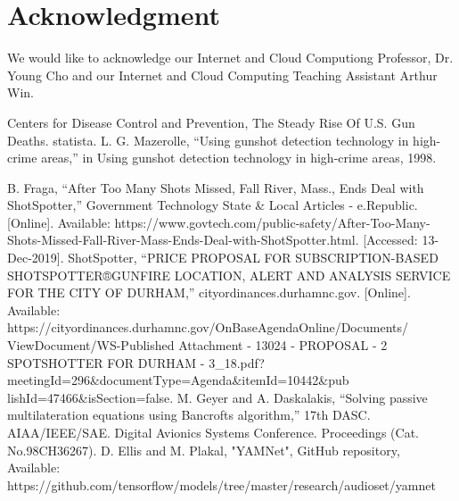 \documentclass[conference]{IEEEtran}
\begin{document}



\section*{Acknowledgment}

We would like to acknowledge our Internet and Cloud Computiong Professor, Dr. Young Cho and our Internet and Cloud Computing  Teaching Assistant Arthur Win.


\begin{thebibliography}{00}
 Centers for Disease Control and Prevention, The Steady Rise Of U.S. Gun Deaths. statista.
 L. G. Mazerolle, “Using gunshot detection technology in high-crime areas,” in Using gunshot detection technology in high-crime areas, 1998.


 B. Fraga, “After Too Many Shots Missed, Fall River, Mass., Ends Deal with ShotSpotter,” Government Technology State \& Local Articles - e.Republic. [Online]. Available: https://www.govtech.com/public-safety/After-Too-Many-Shots-Missed-Fall-River-Mass-Ends-Deal-with-ShotSpotter.html. [Accessed: 13-Dec-2019].
ShotSpotter, “PRICE PROPOSAL FOR SUBSCRIPTION-BASED SHOTSPOTTER®GUNFIRE LOCATION, ALERT AND ANALYSIS SERVICE FOR THE CITY OF DURHAM,” cityordinances.durhamnc.gov. [Online]. Available: https://cityordinances.durhamnc.gov/OnBaseAgendaOnline/Documents/
ViewDocument/WS-Published Attachment - 13024 - PROPOSAL - 2 SPOTSHOTTER FOR DURHAM - 3\_18.pdf?meetingId=296\&documentType=Agenda\&itemId=10442\&pub
lishId=47466\&isSection=false.
 M. Geyer and A. Daskalakis, “Solving passive multilateration equations using Bancrofts algorithm,” 17th DASC. AIAA/IEEE/SAE. Digital Avionics Systems Conference. Proceedings (Cat. No.98CH36267).
 D. Ellis and M. Plakal, "YAMNet", GitHub repository, Available: https://github.com/tensorflow/models/tree/master/research/audioset/yamnet

\end{thebibliography}
\end{document}
